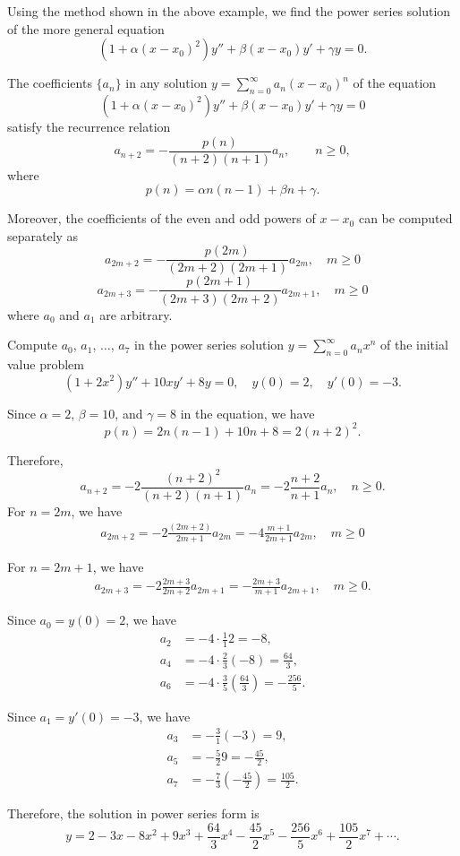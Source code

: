 Using the method shown in the above example, we find the power series solution of the more general equation
\[(1+\alpha(x-x_0)^2)y''+\beta(x-x_0) y'+\gamma y=0.\]
\begin{theorem}
  The coefficients $\{a_n\}$ in any solution $y=\sum_{n=0}^\infty a_n(x-x_0)^n$ of
the equation
\[\left(1+\alpha(x-x_0)^2\right)y''+\beta(x-x_0) y'+\gamma y=0\]
satisfy the recurrence relation
\[a_{n+2}=-\frac{p(n)}{(n+2)(n+1)}a_n,\qquad n\ge0,\]
where
\[p(n)=\alpha n(n-1) +\beta n + \gamma.\]

Moreover, the coefficients of the even and odd powers of $x-x_0$ can be computed separately as
\[a_{2m+2} = -\frac{p(2m)}{(2m+2)(2m+1)}a_{2m},\quad m\ge0\]
\[ a_{2m+3} = -\frac{p(2m+1)}{(2m+3)(2m+2)}a_{2m+1},\quad m\ge0\]
where $a_0$ and $a_1$ are arbitrary.
\end{theorem}

\begin{example}
  Compute $a_0$, $a_1$, $\dots$, $a_7$ in the power series solution $y=\sum\limits_{n=0}^\infty a_nx^n$ of the initial value problem
\[(1+2x^2)y''+10xy'+8y=0,\quad y(0)=2,\quad y'(0)=-3.\]
\end{example}
\begin{solution}
Since $\alpha=2$, $\beta=10$, and $\gamma=8$ in the equation, we have
\[p(n)=2n(n-1)+10n+8=2(n+2)^2.\]

Therefore,
\[a_{n+2}=-2\frac{(n+2)^2}{(n+2)(n+1)}a_n=-2\frac{n+2}{ n+1}a_n,\quad n\ge0.\]
For $n=2m$, we have
\[
  \begin{aligned} a_{2m+2} = -2\frac{(2m+2)}{2m+1}a_{2m}=-4\frac{m+1}{2m+1}a_{2m},\quad m\ge 0
  \end{aligned}
\]

For $n=2m+1$, we have
\[
  \begin{aligned} a_{2m+3} = -2\frac{2m+3}{2m+2}a_{2m+1}=-\frac{2m+3}{ m+1}a_{2m+1},\quad m\ge0.
  \end{aligned}
\]

Since $a_0=y(0)=2$, we have
\[
  \begin{aligned} 
    a_2 &= -4\cdot\frac{1}{1}2=-8,\\
    a_4 &= -4\cdot\frac{2}{3}(-8)=\frac{64}{3},\\
    a_6 &= -4\cdot\frac{3}{5}\left(\frac{64}{3}\right)=-\frac{256}{5}.
  \end{aligned}
\]

Since $a_1=y'(0)=-3$, we have
\[
  \begin{aligned} 
    a_3 &= -\frac{3}{1}(-3)=9,\\
    a_5 &= -\frac{5}{2}9=-\frac{45}{2},\\
    a_7 &= -\frac{7}{3}\left(-\frac{45}{2}\right)=\frac{105}{2}.
  \end{aligned}
\]

Therefore, the solution in power series form is
\[y=2-3x-8x^2+9x^3+\frac{64}{3}x^4-\frac{45}{2}x^5-\frac{256}{5} x^6+\frac{105}{2}x^7+\cdots .\]
\end{solution}


